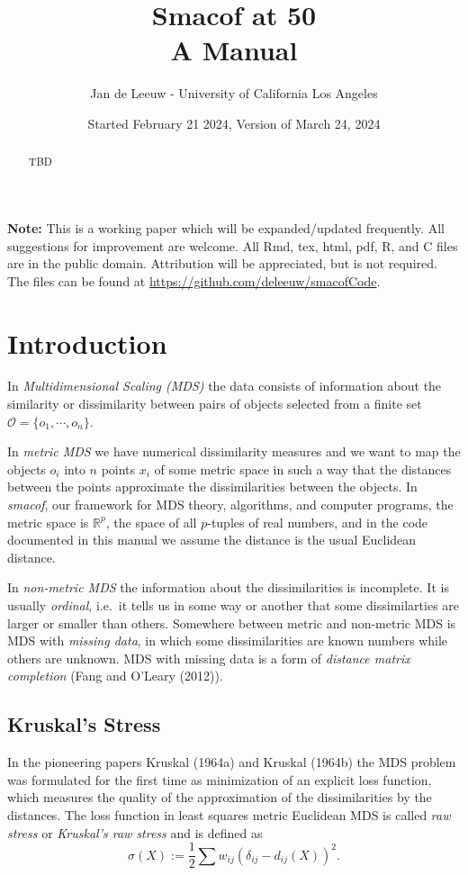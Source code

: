 \documentclass[
  12pt,
]{article}
\title{Smacof at 50\\
A Manual}
\author{Jan de Leeuw - University of California Los Angeles}
\date{Started February 21 2024, Version of March 24, 2024}
\begin{document}
\maketitle
\begin{abstract}
TBD
\end{abstract}

{
\setcounter{tocdepth}{4}
\tableofcontents
}
\textbf{Note:} This is a working paper which will be expanded/updated
frequently. All suggestions for improvement are welcome. All Rmd, tex,
html, pdf, R, and C files are in the public domain. Attribution will be
appreciated, but is not required. The files can be found at
\url{https://github.com/deleeuw/smacofCode}.

\section{Introduction}\label{introduction}

In \emph{Multidimensional Scaling (MDS)} the data consists of information
about the similarity or dissimilarity between pairs of objects selected
from a finite set \(\mathcal{O}=\{o_1,\cdots,o_n\}\).

In \emph{metric MDS} we have numerical dissimilarity measures and we want to
map the objects \(o_i\) into \(n\) points \(x_i\) of some metric space in such
a way that the distances between the points approximate the
dissimilarities between the objects. In \emph{smacof}, our framework for MDS
theory, algorithms, and computer programs, the metric space is
\(\mathbb{R}^p\), the space of all \(p\)-tuples of real numbers, and in the
code documented in this manual we assume the distance is the usual
Euclidean distance.

In \emph{non-metric MDS} the information about the dissimilarities is
incomplete. It is usually \emph{ordinal}, i.e.~it tells us in some way or
another that some dissimilarties are larger or smaller than others.
Somewhere between metric and non-metric MDS is MDS with \emph{missing data},
in which some dissimilarities are known numbers while others are
unknown. MDS with missing data is a form of \emph{distance matrix completion}
(Fang and O'Leary (2012)).

\subsection{Kruskal's Stress}\label{kruskals-stress}

In the pioneering papers Kruskal (1964a) and Kruskal (1964b) the MDS problem
was formulated for the first time as minimization of an explicit loss
function, which measures the quality of the approximation of the
dissimilarities by the distances. The loss function in least squares
metric Euclidean MDS is called \emph{raw stress} or \emph{Kruskal's raw stress}
and is defined as \begin{equation}
\sigma(X):=\frac12\sum w_{ij}(\delta_{ij}-d_{ij}(X))^2.
\label{eq:stressdef}
\end{equation}
\end{document}
